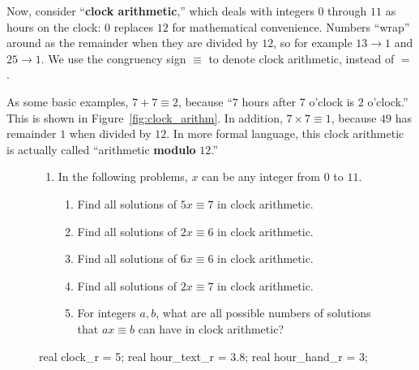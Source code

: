 \documentclass[../gatm.tex]{subfiles}
\begin{document}
\noindent Now, consider ``\textbf{clock arithmetic},'' which deals with integers $0$ through $11$ as hours on the clock: $0$ replaces $12$ for mathematical convenience. Numbers ``wrap'' around as the remainder when they are divided by $12$, so for example $13\to 1$ and $25\to 1$. We use the congruency sign $\equiv$ to denote clock arithmetic, instead of $=$.

As some basic examples, $7+7\equiv 2$, because ``$7$ hours after $7$ o'clock is $2$ o'clock.'' This is shown in Figure~\ref{fig:clock_arithm}. In addition, $7\times 7\equiv 1$, because $49$ has remainder $1$ when divided by $12$. In more formal language, this clock arithmetic is actually called ``arithmetic \textbf{modulo} $12$.''

\begin{figure}[h]
	\begin{center}
		\begin{minipage}[c]{0.55\textwidth}
			\setlength{\parindent}{15pt}
			\setlength{\parskip}{0.25em}
			
			
			\begin{enumerate}
			\setcounter{enumi}{\value{problem_i}}
			\item In the following problems, $x$ can be any integer from $0$ to $11$.
			\begin{enumerate}
			\item Find all solutions of $5x\equiv 7$ in clock arithmetic.
			\item Find all solutions of $2x\equiv 6$ in clock arithmetic.
			\item Find all solutions of $6x\equiv 6$ in clock arithmetic.
			\item Find all solutions of $2x\equiv 7$ in clock arithmetic.
			\item For integers $a,b$, what are all possible numbers of solutions that $ax\equiv b$ can have in clock arithmetic?
			\end{enumerate}
			\setcounter{problem_i}{\value{enumi}}
			\end{enumerate}
		\end{minipage}
		\hfill
		\begin{minipage}[c]{0.35\textwidth}
			\begin{center}
				\begin{minipage}[b]{\textwidth}
					\centering
					\begin{asy}[width=0.7\textwidth]
						real clock_r = 5;
						real hour_text_r = 3.8;
						real hour_hand_r = 3;
						

\end{asy}
\end{minipage}
\end{center}
\end{minipage}
\end{center}
\end{figure}
\end{document}
